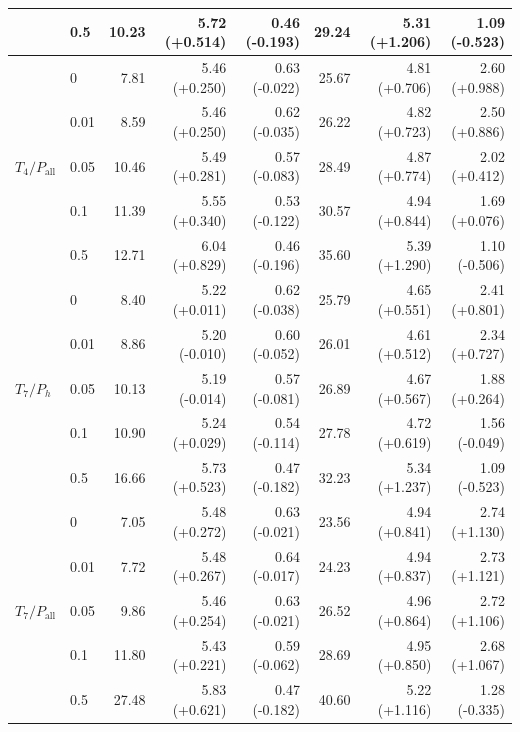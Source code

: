 \begin{table}[!htbp]
\begin{tabular}{@{}llrrrrrr@{}}
 & 0.5 & 10.23 & 5.72 (+0.514) & 0.46 (-0.193) & 29.24 & 5.31 (+1.206) & 1.09 (-0.523) \\
\midrule
\multirow{5}{*}{$T_4/P_{\mathrm{all}}$} & 0 & 7.81 & 5.46 (+0.250) & 0.63 (-0.022) & 25.67 & 4.81 (+0.706) & 2.60 (+0.988) \\
 & 0.01 & 8.59 & 5.46 (+0.250) & 0.62 (-0.035) & 26.22 & 4.82 (+0.723) & 2.50 (+0.886) \\
 & 0.05 & 10.46 & 5.49 (+0.281) & 0.57 (-0.083) & 28.49 & 4.87 (+0.774) & 2.02 (+0.412) \\
 & 0.1 & 11.39 & 5.55 (+0.340) & 0.53 (-0.122) & 30.57 & 4.94 (+0.844) & 1.69 (+0.076) \\
 & 0.5 & 12.71 & 6.04 (+0.829) & 0.46 (-0.196) & 35.60 & 5.39 (+1.290) & 1.10 (-0.506) \\
\midrule
\multirow{5}{*}{$T_7/P_{h}$} & 0 & 8.40 & 5.22 (+0.011) & 0.62 (-0.038) & 25.79 & 4.65 (+0.551) & 2.41 (+0.801) \\
 & 0.01 & 8.86 & 5.20 (-0.010) & 0.60 (-0.052) & 26.01 & 4.61 (+0.512) & 2.34 (+0.727) \\
 & 0.05 & 10.13 & 5.19 (-0.014) & 0.57 (-0.081) & 26.89 & 4.67 (+0.567) & 1.88 (+0.264) \\
 & 0.1 & 10.90 & 5.24 (+0.029) & 0.54 (-0.114) & 27.78 & 4.72 (+0.619) & 1.56 (-0.049) \\
 & 0.5 & 16.66 & 5.73 (+0.523) & 0.47 (-0.182) & 32.23 & 5.34 (+1.237) & 1.09 (-0.523) \\
\midrule
\multirow{5}{*}{$T_7/P_{\mathrm{all}}$} & 0 & 7.05 & 5.48 (+0.272) & 0.63 (-0.021) & 23.56 & 4.94 (+0.841) & 2.74 (+1.130) \\
 & 0.01 & 7.72 & 5.48 (+0.267) & 0.64 (-0.017) & 24.23 & 4.94 (+0.837) & 2.73 (+1.121) \\
 & 0.05 & 9.86 & 5.46 (+0.254) & 0.63 (-0.021) & 26.52 & 4.96 (+0.864) & 2.72 (+1.106) \\
 & 0.1 & 11.80 & 5.43 (+0.221) & 0.59 (-0.062) & 28.69 & 4.95 (+0.850) & 2.68 (+1.067) \\
 & 0.5 & 27.48 & 5.83 (+0.621) & 0.47 (-0.182) & 40.60 & 5.22 (+1.116) & 1.28 (-0.335) \\
\bottomrule
\end{tabular}
\end{table}
